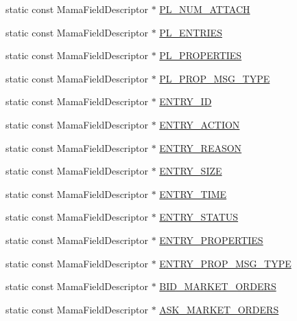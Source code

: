 \begin{CompactItemize}
\item 
static const Mama\-Field\-Descriptor $\ast$ \hyperlink{classWombat_1_1MamdaOrderBookFields_324c67ee932c10000fd2f8ce8f4a538d}{PL\_\-NUM\_\-ATTACH}
\item 
static const Mama\-Field\-Descriptor $\ast$ \hyperlink{classWombat_1_1MamdaOrderBookFields_2c227acb5e43bb610ec0747306777e68}{PL\_\-ENTRIES}
\item 
static const Mama\-Field\-Descriptor $\ast$ \hyperlink{classWombat_1_1MamdaOrderBookFields_90ad84e33b7423bae56802bd55dbdf97}{PL\_\-PROPERTIES}
\item 
static const Mama\-Field\-Descriptor $\ast$ \hyperlink{classWombat_1_1MamdaOrderBookFields_0dd719edd812c3557d3503c4aad7e687}{PL\_\-PROP\_\-MSG\_\-TYPE}
\item 
static const Mama\-Field\-Descriptor $\ast$ \hyperlink{classWombat_1_1MamdaOrderBookFields_50bed0b3a1ce50ae2c1f2f290094eadb}{ENTRY\_\-ID}
\item 
static const Mama\-Field\-Descriptor $\ast$ \hyperlink{classWombat_1_1MamdaOrderBookFields_05a8ea107ecfd10a0e08382b27cb78c6}{ENTRY\_\-ACTION}
\item 
static const Mama\-Field\-Descriptor $\ast$ \hyperlink{classWombat_1_1MamdaOrderBookFields_1ce5d6995239b7ca2e4596c24310db9b}{ENTRY\_\-REASON}
\item 
static const Mama\-Field\-Descriptor $\ast$ \hyperlink{classWombat_1_1MamdaOrderBookFields_72225203218104c06315b90e214f86e6}{ENTRY\_\-SIZE}
\item 
static const Mama\-Field\-Descriptor $\ast$ \hyperlink{classWombat_1_1MamdaOrderBookFields_416d0ec9fbe6850153d54463cdf40ee9}{ENTRY\_\-TIME}
\item 
static const Mama\-Field\-Descriptor $\ast$ \hyperlink{classWombat_1_1MamdaOrderBookFields_81191021a4d256939aa065ab6fb768f1}{ENTRY\_\-STATUS}
\item 
static const Mama\-Field\-Descriptor $\ast$ \hyperlink{classWombat_1_1MamdaOrderBookFields_6b8fc3862dea588b764001ec2fc383ff}{ENTRY\_\-PROPERTIES}
\item 
static const Mama\-Field\-Descriptor $\ast$ \hyperlink{classWombat_1_1MamdaOrderBookFields_d622780a6082a84ffc347a7049b667a2}{ENTRY\_\-PROP\_\-MSG\_\-TYPE}
\item 
static const Mama\-Field\-Descriptor $\ast$ \hyperlink{classWombat_1_1MamdaOrderBookFields_ffce12973e36788619433da8b886b489}{BID\_\-MARKET\_\-ORDERS}
\item 
static const Mama\-Field\-Descriptor $\ast$ \hyperlink{classWombat_1_1MamdaOrderBookFields_d2610afd35e8db866d7ff8c2f5edcaa5}{ASK\_\-MARKET\_\-ORDERS}

\end{CompactItemize}
